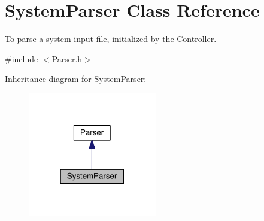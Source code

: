 \hypertarget{classSystemParser}{\section{System\+Parser Class Reference}
\label{classSystemParser}
}


To parse a system input file, initialized by the \hyperlink{classController}{Controller}.  




{\ttfamily \#include $<$Parser.\+h$>$}



Inheritance diagram for System\+Parser\+:\nopagebreak
\begin{figure}[H]
\begin{center}
\leavevmode
\includegraphics[width=159pt]{classSystemParser__inherit__graph}
\end{center}
\end{figure}


